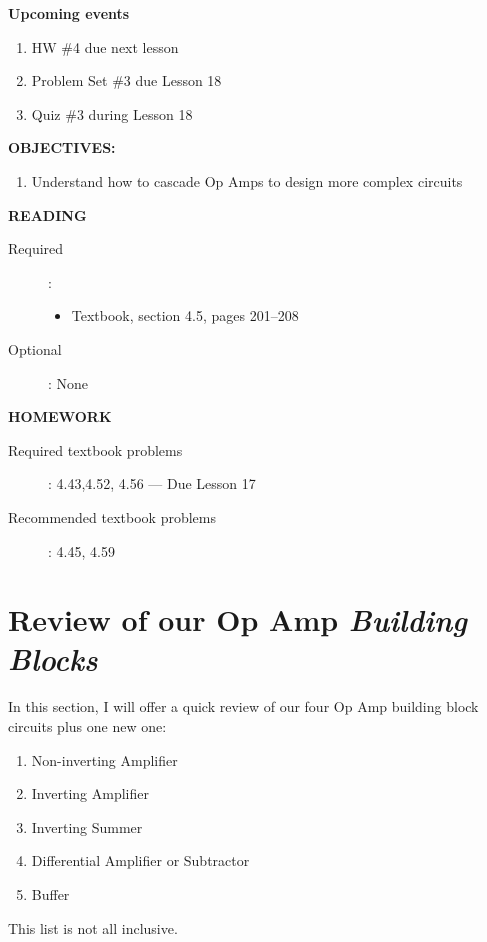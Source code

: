 \documentclass{handout}
\begin{document}
\maketitle

\textbf{Upcoming events}
\begin{enumerate}
\item HW \#4 due next lesson
\item Problem Set \#3 due Lesson 18
\item Quiz \#3 during Lesson 18
\end{enumerate}

\textbf{OBJECTIVES:}
\begin{enumerate}
\item Understand how to cascade Op Amps to design more complex circuits
\end{enumerate}

\textbf{READING}
\begin{description}
\item [Required]:
\begin{itemize}
\item  Textbook, section 4.5, pages 201--208
\end{itemize}
\item [Optional]: None
\end{description}

\textbf{HOMEWORK}
\begin{description}
\item [Required textbook problems]: 4.43,4.52, 4.56 --- Due Lesson 17
\item [Recommended textbook problems]: 4.45, 4.59
\end{description}

\section{Review of our Op Amp {\em Building Blocks}}
In this section, I will offer a quick review of our four Op Amp building block circuits plus one new one:
\begin{enumerate}
\item Non-inverting Amplifier
\item Inverting Amplifier
\item Inverting Summer
\item Differential Amplifier or Subtractor
\item Buffer
\end{enumerate}

This list is not all inclusive.
\end{document}
